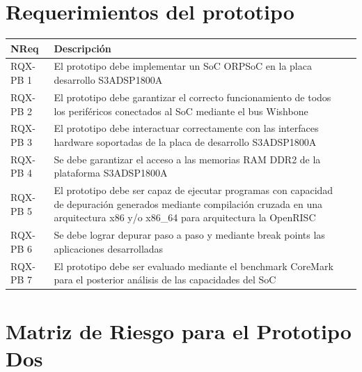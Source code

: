 		\section{Requerimientos del prototipo}
		\begin{table}[h!]
		\centering
		\begin{tabular}{ p{2.5cm} p{8cm} p{3cm} }
		\hline 
		\rowcolor[gray]{0.8} N\textordmasculine Req & Descripción\\
		\hline 
		RQX-PB 1 & El prototipo debe implementar un SoC ORPSoC en la placa desarrollo S3ADSP1800A\\ 
		\hline 
		RQX-PB 2 & El prototipo debe garantizar el correcto funcionamiento de todos los periféricos conectados al SoC mediante el bus Wishbone\\ 
		\hline 
		RQX-PB 3 & El prototipo debe interactuar correctamente con las interfaces hardware soportadas de la placa de desarrollo S3ADSP1800A\\ 
		\hline
		RQX-PB 4 & Se debe garantizar el acceso a las memorias RAM DDR2 de la plataforma S3ADSP1800A\\
		\hline
		RQX-PB 5 & El prototipo debe ser capaz de ejecutar programas con capacidad de depuración generados mediante compilación
		cruzada en una arquitectura x86 y/o x86\_64 para arquitectura la OpenRISC\\
		\hline
		RQX-PB 6 & Se debe lograr depurar paso a paso y mediante break points las aplicaciones desarrolladas\\
		\hline
		RQX-PB 7 & El prototipo debe ser evaluado mediante el benchmark CoreMark para el posterior análisis de las capacidades del SoC\\
		\hline		
		\end{tabular}
		\end{table}

\newpage
		\section{Matriz de Riesgo para el Prototipo Dos} 

